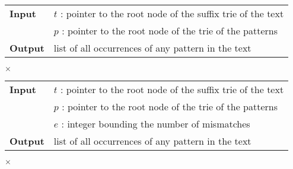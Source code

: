\begin{center}
\begin{minipage}[t]{.8\textwidth}
\begin{algorithm}[H]
\begin{tabular}{ll}
\textbf{Input}  & $t$ : pointer to the root node of the suffix trie of the text\\
 			    & $p$ : pointer to the root node of the trie of the patterns\\
\textbf{Output} & list of all occurrences of any pattern in the text\\
\end{tabular}
\begin{algorithmic}[1]
	\State \Report {} $\times$ 
\Else
	\State {}
	\Repeat
			\State {}
			\State {}
		\EndIf
\EndIf
\end{algorithmic}
\label{alg:st-exact-multi}
\end{algorithm}
\end{minipage}
\end{center}

\begin{center}
\begin{minipage}[t]{.8\textwidth}
\begin{algorithm}[H]
\begin{tabular}{ll}
\textbf{Input}  & $t$ : pointer to the root node of the suffix trie of the text\\
 			    & $p$ : pointer to the root node of the trie of the patterns\\
 			    & $e$ : integer bounding the number of mismatches\\
\textbf{Output} & list of all occurrences of any pattern in the text\\
\end{tabular}
\begin{algorithmic}[1]
		\State \Report {} $\times$ 
		\Repeat
			\Repeat
				\State {}
	\EndIf
\EndIf
\end{algorithmic}
\label{alg:st-hamming-multi}
\end{algorithm}
\end{minipage}
\end{center}

